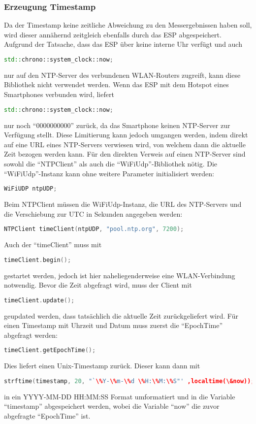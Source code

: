 \subsubsection{Erzeugung Timestamp}
	Da der Timestamp keine zeitliche Abweichung zu den Messergebnissen haben soll, wird dieser annähernd zeitgleich ebenfalls durch das ESP abgespeichert.
	Aufgrund der Tatsache, dass das ESP über keine interne Uhr verfügt und auch 
\begin{lstlisting}[language=C++]
	std::chrono::system_clock::now;
\end{lstlisting}
	nur auf den NTP-Server des verbundenen WLAN-Routers zugreift, kann diese Bibliothek nicht verwendet werden. Wenn das ESP mit dem Hotspot eines Smartphones verbunden wird, liefert 
\begin{lstlisting}[language=C++]
	std::chrono::system_clock::now;
\end{lstlisting}
	nur noch "`0000000000"' zurück, da das Smartphone keinen NTP-Server zur Verfügung stellt.
	Diese Limitierung kann jedoch umgangen werden, indem direkt auf eine URL eines NTP-Servers verwiesen wird, von welchem dann die aktuelle Zeit bezogen werden kann.
	Für den direkten Verweis auf einen NTP-Server sind sowohl die "`NTPClient"' als auch die "`WiFiUdp"'-Bibliothek nötig.
	Die "`WiFiUdp"'-Instanz kann ohne weitere Parameter initialisiert werden:
\begin{lstlisting}[language=C++]
	WiFiUDP ntpUDP;
\end{lstlisting}
	Beim NTPClient müssen die WiFiUdp-Instanz, die URL des NTP-Servers und die Verschiebung zur UTC in Sekunden angegeben werden: 
\begin{lstlisting}[language=C++]
	NTPClient timeClient(ntpUDP, "pool.ntp.org", 7200);
\end{lstlisting}
	Auch der "`timeClient"' muss mit 
\begin{lstlisting}[language=C++]
	timeClient.begin();
\end{lstlisting}
	gestartet werden, jedoch ist hier naheliegenderweise eine WLAN-Verbindung notwendig.
	Bevor die Zeit abgefragt wird, muss der Client mit 
\begin{lstlisting}[language=C++]
	timeClient.update();
\end{lstlisting}
	geupdated werden, dass tatsächlich die aktuelle Zeit zurückgeliefert wird.
	Für einen Timestamp mit Uhrzeit und Datum muss zuerst die "`EpochTime"' abgefragt werden:
\begin{lstlisting}[language=C++]
	timeClient.getEpochTime();
\end{lstlisting}
	Dies liefert einen Unix-Timestamp zurück.
	Dieser kann dann mit 
\begin{lstlisting}[language=C++]
	strftime(timestamp, 20, "`\%Y-\%m-\%d \%H:\%M:\%S"' ,localtime(\&now));
\end{lstlisting}
	in ein YYYY-MM-DD HH:MM:SS Format umformatiert und in die Variable "`timestamp"' abgespeichert werden, wobei die Variable "`now"' die zuvor abgefragte "`EpochTime"' ist.
	